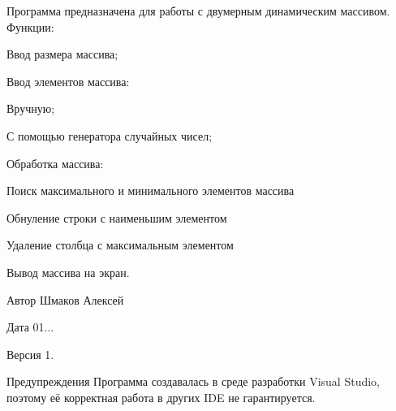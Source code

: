Программа предназначена для работы с двумерным динамическим массивом. Функции\+:
\begin{DoxyItemize}
\item Ввод размера массива;
\item Ввод элементов массива\+:
\end{DoxyItemize}
\begin{DoxyEnumerate}
\item Вручную;
\item С помощью генератора случайных чисел;
\end{DoxyEnumerate}
\begin{DoxyItemize}
\item Обработка массива\+:
\end{DoxyItemize}
\begin{DoxyEnumerate}
\item Поиск максимального и минимального элементов массива
\item Обнуление строки с наименьшим элементом
\item Удаление столбца с максимальным элементом
\end{DoxyEnumerate}
\begin{DoxyItemize}
\item Вывод массива на экран. \begin{DoxyAuthor}{Автор}
Шмаков Алексей 
\end{DoxyAuthor}
\begin{DoxyDate}{Дата}
01... 
\end{DoxyDate}
\begin{DoxyVersion}{Версия}
1. 
\end{DoxyVersion}
\begin{DoxyWarning}{Предупреждения}
Программа создавалась в среде разработки Visual Studio, поэтому её корректная работа в других I\+DE не гарантируется. 
\end{DoxyWarning}

\end{DoxyItemize}